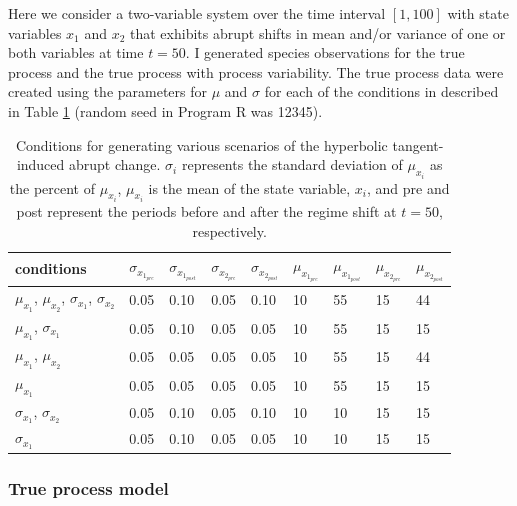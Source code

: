 \documentclass[12pt,twoside,openany]{reedthesis}
\begin{document}
Here we consider a two-variable system over the time interval \([1,100]\) with state variables \(x_1\) and \(x_2\) that exhibits abrupt shifts in mean and/or variance of one or both variables at time \(t=50\). I generated species observations for the true process and the true process with process variability. The true process data were created using the parameters for \(\mu\) and \(\sigma\) for each of the conditions in described in Table \ref{tab:sysParams} (random seed in Program R was 12345).
\begin{table}[t]

\caption{\label{tab:sysParams}Conditions for generating various scenarios of the hyperbolic tangent-induced abrupt change. $\sigma_i$ represents the standard deviation of $\mu_{x_i}$ as the percent of $\mu_{x_i}$, $\mu_{x_i}$ is the mean of the state variable, $x_i$, and pre and post represent the periods before and after the regime shift at $t=50$, respectively.}
\centering
\begin{tabular}{lllllllll}
\toprule
conditions & $\sigma_{x_{1_{pre}}}$ & $\sigma_{x_{1_{post}}}$ & $\sigma_{x_{2_{pre}}}$ & $\sigma_{x_{2_{post}}}$ & $\mu_{x_{1_{pre}}}$ & $\mu_{x_{1_{post}}}$ & $\mu_{x_{2_{pre}}}$ & $\mu_{x_{2_{post}}}$\\
\midrule
$\mu_{x_1}$, $\mu_{x_2}$, $\sigma_{x_1}$, $\sigma_{x_2}$ & 0.05 & 0.10 & 0.05 & 0.10 & 10 & 55 & 15 & 44\\
$\mu_{x_1}$, $\sigma_{x_1}$ & 0.05 & 0.10 & 0.05 & 0.05 & 10 & 55 & 15 & 15\\
$\mu_{x_1}$, $\mu_{x_2}$ & 0.05 & 0.05 & 0.05 & 0.05 & 10 & 55 & 15 & 44\\
$\mu_{x_1}$ & 0.05 & 0.05 & 0.05 & 0.05 & 10 & 55 & 15 & 15\\
$\sigma_{x_1}$, $\sigma_{x_2}$ & 0.05 & 0.10 & 0.05 & 0.10 & 10 & 10 & 15 & 15\\
\addlinespace
$\sigma_{x_1}$ & 0.05 & 0.10 & 0.05 & 0.05 & 10 & 10 & 15 & 15\\
\bottomrule
\end{tabular}
\end{table}
\hypertarget{true-process-model}{%
\subsubsection{True process model}\label{true-process-model}}
\end{document}
